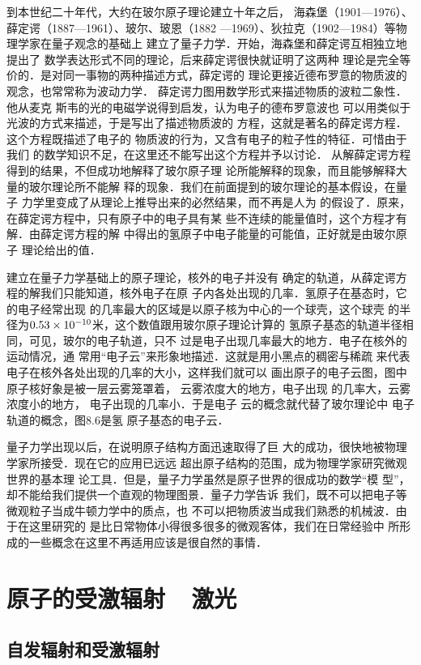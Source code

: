 到本世纪二十年代，大约在玻尔原子理论建立十年之后，
海森堡（1901—1976）、薛定谔（1887—1961）、玻尔、玻恩（1882
—1969）、狄拉克（1902—1984）等物理学家在量子观念的基础上
建立了量子力学．开始，海森堡和薛定谔互相独立地提出了
数学表达形式不同的理论，后来薛定谔很快就证明了这两种
理论是完全等价的．是对同一事物的两种描述方式，薛定谔的
理论更接近德布罗意的物质波的观念，也常常称为波动力学．
薛定谔力图用数学形式来描述物质的波粒二象性．他从麦克
斯韦的光的电磁学说得到启发，认为电子的德布罗意波也
可以用类似于光波的方式来描述，于是写出了描述物质波的
方程，这就是著名的薛定谔方程．这个方程既描述了电子的
物质波的行为，又含有电子的粒子性的特征．可惜由于我们
的数学知识不足，在这里还不能写出这个方程并予以讨论．
从解薛定谔方程得到的结果，不但成功地解释了玻尔原子理
论所能解释的现象，而且能够解释大量的玻尔理论所不能解
释的现象．我们在前面提到的玻尔理论的基本假设，在量子
力学里变成了从理论上推导出来的必然结果，而不再是人为
的假设了．原来，在薛定谔方程中，只有原子中的电子具有某
些不连续的能量值时，这个方程才有解．由薛定谔方程的解
中得出的氢原子中电子能量的可能值，正好就是由玻尔原子
理论给出的值．

建立在量子力学基础上的原子理论，核外的电子并没有
确定的轨道，从薛定谔方程的解我们只能知道，核外电子在原
子内各处出现的几率．氢原子在基态时，它的电子经常出现
的几率最大的区域是以原子核为中心的一个球壳，这个球壳
的半径为$0.53\times10^{-10}$米，这个数值跟用玻尔原子理论计算的
氢原子基态的轨道半径相同，可见，玻尔的电子轨道，只不
过是电子出现几率最大的地方．电子在核外的运动情况，通
常用“电子云”来形象地描述．这就是用小黑点的稠密与稀疏
来代表电子在核外各处出现的几率的大小，这样我们就可以
画出原子的电子云图，图中原子核好象是被一层云雾笼罩着，
云雾浓度大的地方，电子出现
的几率大，云雾浓度小的地方，
电子出现的几率小．于是电子
云的概念就代替了玻尔理论中
电子轨道的概念，图8.6是氢
原子基态的电子云．


量子力学出现以后，在说明原子结构方面迅速取得了巨
大的成功，很快地被物理学家所接受．现在它的应用已远远
超出原子结构的范围，成为物理学家研究微观世界的基本理
论工具．但是，量子力学虽然是原子世界的很成功的数学“模
型”，却不能给我们提供一个直观的物理图景．量子力学告诉
我们，既不可以把电子等微观粒子当成牛顿力学中的质点，也
不可以把物质波当成我们熟悉的机械波．由于在这里研究的
是比日常物体小得很多很多的微观客体，我们在日常经验中
所形成的一些概念在这里不再适用应该是很自然的事情．


\section{原子的受激辐射~~激光}
\subsection{自发辐射和受激辐射}

